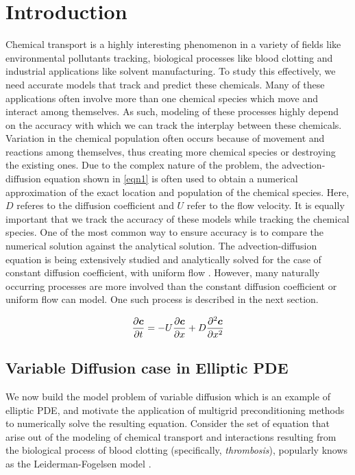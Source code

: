 \section{Introduction}\label{sec:intro} %

Chemical transport is a highly interesting phenomenon in a variety of fields like environmental pollutants tracking, biological processes like blood clotting and industrial applications like solvent manufacturing. To study this effectively, we need accurate models that track and predict these chemicals. Many of these applications often involve more than one chemical species which move and interact among themselves. As such, modeling of these processes highly depend on the accuracy with which we can track the interplay between these chemicals. Variation in the chemical population often occurs because of movement and reactions among themselves, thus creating more chemical species or destroying the existing ones. Due to the complex nature of the problem, the advection-diffusion equation shown in \eqref{eqn1} is often used to obtain a numerical approximation of the exact location and population of the chemical species. Here, $D$ referes to the diffusion coefficient and $U$ refer to the flow velocity. It is equally important that we track the accuracy of these models while tracking the chemical species. One of the most common way to ensure accuracy is to compare the numerical solution against the analytical solution. The advection-diffusion equation is being extensively studied and analytically solved for the case of constant diffusion coefficient, with uniform flow \cite{carslaw1959heat,van1982analytical}. However, many naturally occurring processes are more involved than the constant diffusion coefficient or uniform flow can model. One such process is described in the next section.


\begin{align}
    \frac{\partial  \boldsymbol{c}}{\partial t} = -U\frac{\partial \boldsymbol{c}}{\partial x} + D\frac{\partial^2 \boldsymbol{c}}{\partial x^2} \label{eqn1}
\end{align}

\subsection{Variable Diffusion case in Elliptic PDE} \label{sec:Thrombosis}

We now build the model problem of variable diffusion which is an example of elliptic PDE, and motivate the application of multigrid preconditioning methods to numerically solve the resulting equation. Consider the set of equation that arise out of the modeling of chemical transport and interactions resulting from the biological process of blood clotting (specifically, \textit{thrombosis}), popularly knows as the Leiderman-Fogelsen model \cite{leiderman2011grow,l2013influence}.\\

